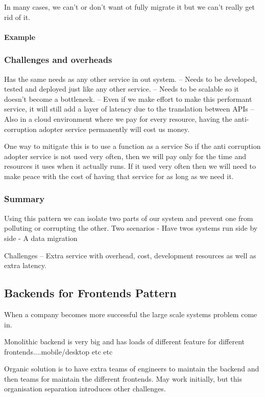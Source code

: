 \documentclass[a4paper, 11pt]{book}
\begin{document}
    In many cases, we can't or don't want ot fully migrate it but we can't really get rid of it.

    \paragraph{Example}

    \subsubsection{Challenges and overheads}
    Has the same needs as any other service in out system.
    -- Needs to be developed, tested and deployed just like any other service.
    -- Needs to be scalable so it doesn't become a bottleneck.
    -- Even if we make effort to make this performant service, it will still add a layer of latency due to the translation between APIs
    -- Also in a cloud environment where we pay for every resource, having the anti-corruption adopter service permanently will cost us money.

    One way to mitigate this is to use a function as a service
    So if the anti corruption adopter service is not used very often, then we will pay only for the time and resources it uses when it actually runs.
    If it used very often then we will need to make peace with the cost of having that service for as long as we need it.

    \subsubsection{Summary}
    Using this pattern we can isolate two parts of our system and prevent one from polluting or corrupting the other.
    Two scenarios
    - Have twos systems run side by side
    - A data migration

    Challenges
    -- Extra service with overhead, cost, development resources as well as extra latency.

    \subsection{Backends for Frontends Pattern}
    When a company becomes more successful the large scale systems problem come in.

    Monolithic backend is very big and has loads of different feature for different frontends....mobile/desktop etc etc

    Organic solution is to have extra teams of engineers to maintain the backend and then teams for maintain the different frontends.
    May work initially, but this organisation separation introduces other challenges.
\end{document}
